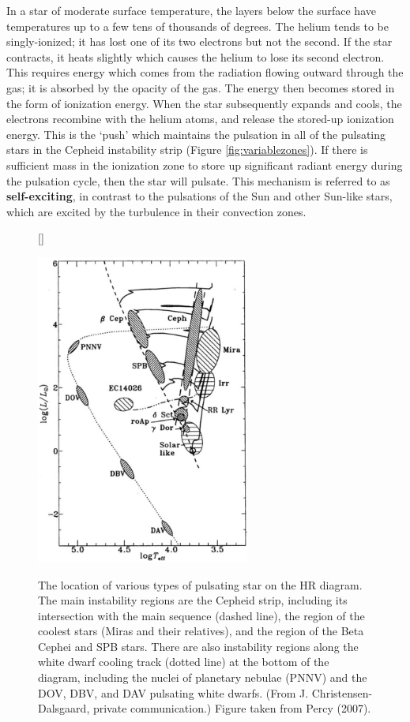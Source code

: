 \documentclass[a4paper,10pt]{article}
\begin{document}
{\noindent}In a star of moderate surface temperature, the layers below the surface have temperatures up to a few tens of thousands of degrees. The helium tends to be singly-ionized; it has lost one of its two electrons but not the second. If the star contracts, it heats slightly which causes the helium to lose its second electron. This requires energy which comes from the radiation flowing outward through the gas; it is absorbed by the opacity of the gas. The energy then becomes stored in the form of ionization energy. When the star subsequently expands and cools, the electrons recombine with the helium atoms, and release the stored-up ionization energy. This is the `push' which maintains the pulsation in all of the pulsating stars in the Cepheid instability strip (Figure \ref{fig:variablezones}). If there is sufficient mass in the ionization zone to store up significant radiant energy during the pulsation cycle, then the star will pulsate. This mechanism is referred to as \textbf{self-exciting}, in contrast to the pulsations of the Sun and other Sun-like stars, which are excited by the turbulence in their convection zones.

\begin{figure}[t]
    [\FBwidth]
    {\caption{\footnotesize{The location of various types of pulsating star on the HR diagram. The main instability regions are the Cepheid strip, including its intersection with the main sequence (dashed line), the region of the coolest stars (Miras and their relatives), and the region of the Beta Cephei and SPB stars. There are also instability regions along the white dwarf cooling track (dotted line) at the bottom of the diagram, including the nuclei of planetary nebulae (PNNV) and the DOV, DBV, and DAV pulsating white dwarfs. (From J. Christensen-Dalsgaard, private communication.) Figure taken from Percy (2007).}}
    \label{fig:hrpulsating}}
    {\includegraphics[width=7cm]{figures/HR_pulsating.png}}
\end{figure}
\end{document}
